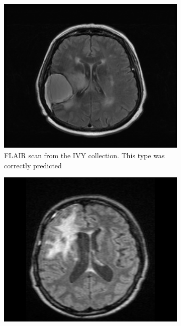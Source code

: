 \begin{figure}
\centering
    \begin{subfigure}[t]{0.25\textwidth}
        \centering
        \includegraphics[width=\textwidth]{Figures/FLAIR_Ivy}
        \caption{\gls{FLAIR} \gls{scan} from the \gls{IVY} collection. This \gls{type} was correctly predicted}\label{fig:IvyGAP_FLAIR}
    \end{subfigure}
    \hfill
    \begin{subfigure}[t]{0.25\textwidth}
        \centering
        \includegraphics[width=\textwidth]{Figures/FLAIR_RIDER}

\end{subfigure}
\end{figure}
